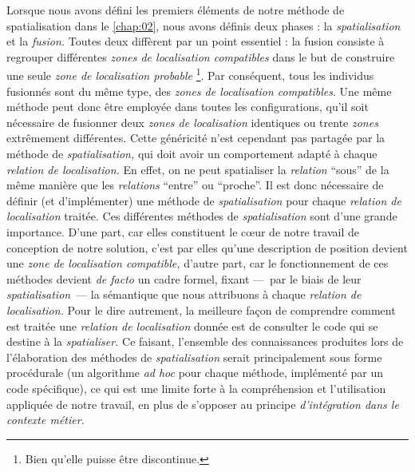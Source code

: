 Lorsque nous avons défini les premiers éléments de notre méthode de
spatialisation dans le \autoref{chap:02}, nous avons définis deux
phases : la \emph{spatialisation} et la \emph{fusion.} Toutes deux
diffèrent par un point essentiel : la fusion consiste à regrouper
différentes \emph{zones de localisation compatibles} dans le but de
construire une seule \emph{zone de localisation probable}
\footnote{Bien qu'elle puisse être discontinue.}. Par conséquent, tous
les individus fusionnés sont du même type, des \emph{zones de
  localisation compatibles}. Une même méthode peut donc être employée
dans toutes les configurations, qu'il soit nécessaire de fusionner
deux \emph{zones de localisation} identiques ou trente \emph{zones}
extrêmement différentes. Cette généricité n'est cependant pas partagée
par la méthode de \emph{spatialisation,} qui doit avoir un
comportement adapté à chaque \emph{relation de localisation.} En
effet, on ne peut spatialiser la \emph{relation} \enquote{sous} de la
même manière que les \emph{relations} \enquote{entre} ou
\enquote{proche}. Il est donc nécessaire de définir (et d'implémenter)
une méthode de \emph{spatialisation} pour chaque \emph{relation de
  localisation} traitée. Ces différentes méthodes de
\emph{spatialisation} sont d'une grande importance. D'une part, car
elles constituent le cœur de notre travail de conception de notre
solution, c'est par elles qu'une description de position devient une
\emph{zone de localisation compatible,} d'autre part, car le
fonctionnement de ces méthodes devient \emph{de facto} un cadre
formel, fixant ---~par le biais de leur \emph{spatialisation}~--- la
sémantique que nous attribuons à chaque \emph{relation de
  localisation.} Pour le dire autrement, la meilleure façon de
comprendre comment est traitée une \emph{relation de localisation}
donnée est de consulter le code qui se destine à la
\emph{spatialiser.} Ce faisant, l'ensemble des connaissances produites
lors de l'élaboration des méthodes de \emph{spatialisation} serait
principalement sous forme procédurale (\ie un algorithme \emph{ad hoc}
pour chaque méthode, implémenté par un code spécifique), ce qui est
une limite forte à la compréhension et l'utilisation appliquée de
notre travail, en plus de s'opposer au principe \emph{d'intégration
  dans le contexte métier.}

